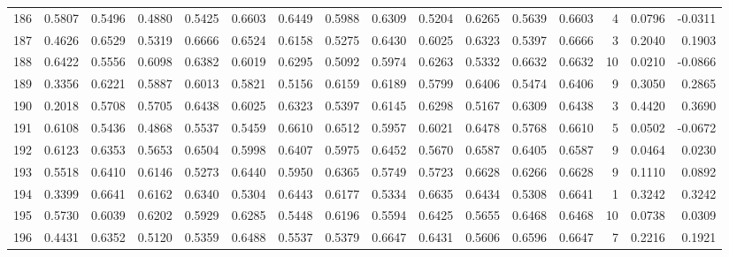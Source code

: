 \begin{tabular}{lrrrrrrrrrrrrrrr}
186 &      0.5807 &  0.5496 &  0.4880 &  0.5425 &  0.6603 &  0.6449 &  0.5988 &  0.6309 &  0.5204 &  0.6265 &   0.5639 &     0.6603 &      4 &                    0.0796 &                    -0.0311 \\
187 &      0.4626 &  0.6529 &  0.5319 &  0.6666 &  0.6524 &  0.6158 &  0.5275 &  0.6430 &  0.6025 &  0.6323 &   0.5397 &     0.6666 &      3 &                    0.2040 &                     0.1903 \\
188 &      0.6422 &  0.5556 &  0.6098 &  0.6382 &  0.6019 &  0.6295 &  0.5092 &  0.5974 &  0.6263 &  0.5332 &   0.6632 &     0.6632 &     10 &                    0.0210 &                    -0.0866 \\
189 &      0.3356 &  0.6221 &  0.5887 &  0.6013 &  0.5821 &  0.5156 &  0.6159 &  0.6189 &  0.5799 &  0.6406 &   0.5474 &     0.6406 &      9 &                    0.3050 &                     0.2865 \\
190 &      0.2018 &  0.5708 &  0.5705 &  0.6438 &  0.6025 &  0.6323 &  0.5397 &  0.6145 &  0.6298 &  0.5167 &   0.6309 &     0.6438 &      3 &                    0.4420 &                     0.3690 \\
191 &      0.6108 &  0.5436 &  0.4868 &  0.5537 &  0.5459 &  0.6610 &  0.6512 &  0.5957 &  0.6021 &  0.6478 &   0.5768 &     0.6610 &      5 &                    0.0502 &                    -0.0672 \\
192 &      0.6123 &  0.6353 &  0.5653 &  0.6504 &  0.5998 &  0.6407 &  0.5975 &  0.6452 &  0.5670 &  0.6587 &   0.6405 &     0.6587 &      9 &                    0.0464 &                     0.0230 \\
193 &      0.5518 &  0.6410 &  0.6146 &  0.5273 &  0.6440 &  0.5950 &  0.6365 &  0.5749 &  0.5723 &  0.6628 &   0.6266 &     0.6628 &      9 &                    0.1110 &                     0.0892 \\
194 &      0.3399 &  0.6641 &  0.6162 &  0.6340 &  0.5304 &  0.6443 &  0.6177 &  0.5334 &  0.6635 &  0.6434 &   0.5308 &     0.6641 &      1 &                    0.3242 &                     0.3242 \\
195 &      0.5730 &  0.6039 &  0.6202 &  0.5929 &  0.6285 &  0.5448 &  0.6196 &  0.5594 &  0.6425 &  0.5655 &   0.6468 &     0.6468 &     10 &                    0.0738 &                     0.0309 \\
196 &      0.4431 &  0.6352 &  0.5120 &  0.5359 &  0.6488 &  0.5537 &  0.5379 &  0.6647 &  0.6431 &  0.5606 &   0.6596 &     0.6647 &      7 &                    0.2216 &                     0.1921 \\

\end{tabular}

